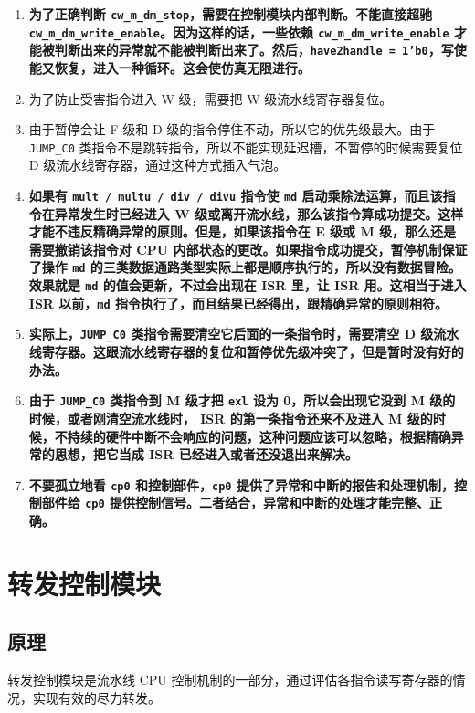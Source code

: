 \documentclass[12pt,AutoFakeBold,AutoFakeSlant]{article}
\providecommand{\tightlist}{%
  \setlength{\itemsep}{0pt}\setlength{\parskip}{0pt}}
\newcommand{\ms}[1]{\texttt{#1}}
\begin{document}
\begin{enumerate}
\tightlist
\item
\textbf{为了正确判断 \texttt{cw\_m\_dm\_stop}，需要在控制模块内部判断。不能直接超驰 \ms{cw\_m\_dm\_write\_enable}。因为这样的话，一些依赖 \ms{cw\_m\_dm\_write\_enable} 才能被判断出来的异常就不能被判断出来了。然后，\ms{have2handle = 1'b0}，写使能又恢复，进入一种循环。这会使仿真无限进行。} 
\item
为了防止受害指令进入 W 级，需要把 W 级流水线寄存器复位。
\item
由于暂停会让 F 级和 D 级的指令停住不动，所以它的优先级最大。由于 \texttt{JUMP\_C0} 类指令不是跳转指令，所以不能实现延迟槽，不暂停的时候需要复位 D 级流水线寄存器，通过这种方式插入气泡。
\item
\textbf{如果有 \texttt{mult\ /\ multu\ /\ div\ /\ divu}
指令使 \ms{md} 启动乘除法运算，而且该指令在异常发生时已经进入 W 级或离开流水线，那么该指令算成功提交。这样才能不违反精确异常的原则。但是，如果该指令在 E 级或 M 级，那么还是需要撤销该指令对 CPU 内部状态的更改。如果指令成功提交，暂停机制保证了操作 \texttt{md} 的三类数据通路类型实际上都是顺序执行的，所以没有数据冒险。效果就是 \texttt{md} 的值会更新，不过会出现在 ISR 里，让 ISR 用。这相当于进入 ISR 以前，\ms{md} 指令执行了，而且结果已经得出，跟精确异常的原则相符。}
\item
\textbf{实际上，\ms{JUMP\_C0} 类指令需要清空它后面的一条指令时，需要清空 D 级流水线寄存器。这跟流水线寄存器的复位和暂停优先级冲突了，但是暂时没有好的办法。}
\item
\textbf{由于 \ms{JUMP\_C0} 类指令到 M 级才把 \ms{exl} 设为 0，所以会出现它没到 M 级的时候，或者刚清空流水线时， ISR 的第一条指令还来不及进入 M 级的时候，不持续的硬件中断不会响应的问题，这种问题应该可以忽略，根据精确异常的思想，把它当成 ISR 已经进入或者还没退出来解决。}
\item
\textbf{不要孤立地看 \ms{cp0} 和控制部件，\ms{cp0} 提供了异常和中断的报告和处理机制，控制部件给 \ms{cp0} 提供控制信号。二者结合，异常和中断的处理才能完整、正确。}
\end{enumerate}

\section{转发控制模块}

\subsection{原理}

转发控制模块是流水线 CPU 控制机制的一部分，通过评估各指令读写寄存器的情况，实现有效的尽力转发。
\end{document}
